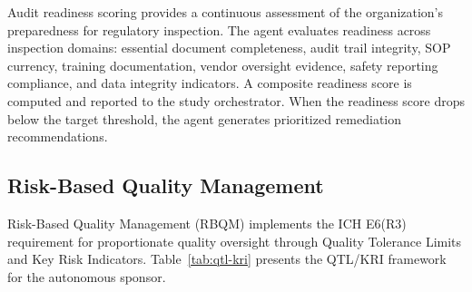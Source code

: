 Audit readiness scoring provides a continuous assessment of the organization's preparedness
for regulatory inspection. The agent evaluates readiness across inspection domains: essential
document completeness, audit trail integrity, SOP currency, training documentation, vendor
oversight evidence, safety reporting compliance, and data integrity indicators. A composite
readiness score is computed and reported to the study orchestrator. When the readiness score
drops below the target threshold, the agent generates prioritized remediation recommendations.

\subsection{Risk-Based Quality Management}

Risk-Based Quality Management (RBQM) implements the ICH E6(R3) requirement for
proportionate quality oversight through Quality Tolerance Limits and Key Risk Indicators.
Table~\ref{tab:qtl-kri} presents the QTL/KRI framework for the autonomous sponsor.

